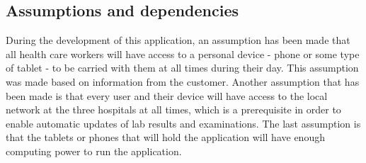 \subsection{Assumptions and dependencies}
During the development of this application, an assumption has been made that all health care workers will have access to a personal device - phone or some type of tablet - to be carried with them at all times during their day. This assumption was made based on information from the customer. Another assumption that has been made is that every user and their device will have access to the local network at the three hospitals at all times, which is a prerequisite in order to enable automatic updates of lab results and examinations. The last assumption is that the tablets or phones that will hold the application will have enough computing power to run the application.  